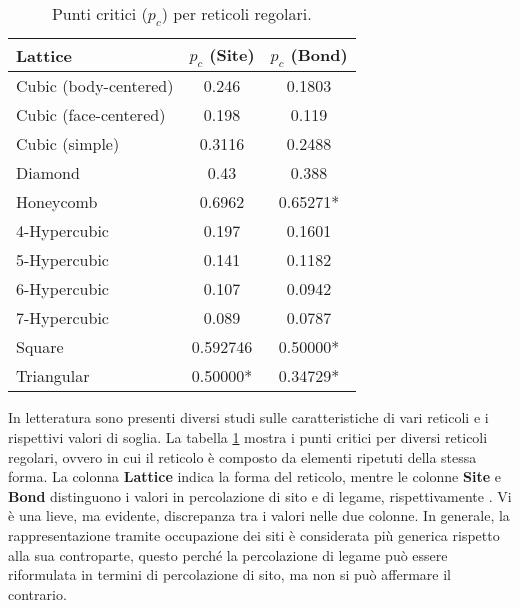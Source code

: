 \begin{table}[ht!]
    \centering
    \begin{tabular}{lcc}
    \toprule
    \textbf{Lattice} & \textbf{\(p_c\) (Site)} & \textbf{\(p_c\) (Bond)} \\
    \midrule
    Cubic (body-centered) & 0.246    & 0.1803    \\
    Cubic (face-centered) & 0.198    & 0.119     \\
    Cubic (simple)        & 0.3116   & 0.2488    \\
    Diamond               & 0.43     & 0.388     \\
    Honeycomb             & 0.6962   & 0.65271*  \\
    4-Hypercubic          & 0.197    & 0.1601    \\
    5-Hypercubic          & 0.141    & 0.1182    \\
    6-Hypercubic          & 0.107    & 0.0942    \\
    7-Hypercubic          & 0.089    & 0.0787    \\
    Square                & 0.592746 & 0.50000*  \\
    Triangular            & 0.50000* & 0.34729*  \\
    \bottomrule
    \end{tabular}
    \caption{Punti critici (\(p_c\)) per reticoli regolari.}
    \label{tab:percolation}
\end{table}

In letteratura sono presenti diversi studi sulle caratteristiche di vari 
reticoli e i rispettivi valori di soglia. La tabella \ref{tab:percolation}
mostra i punti critici per diversi reticoli regolari, ovvero in cui il reticolo è composto
da elementi ripetuti della stessa forma. La colonna \textbf{Lattice} indica la forma 
del reticolo, mentre le colonne \textbf{Site} e \textbf{Bond} distinguono i valori 
in percolazione di sito e di legame, rispettivamente \cite{stauffer-threshold}.
Vi è una lieve, ma evidente, discrepanza tra i valori nelle due colonne.
In generale, la rappresentazione tramite occupazione dei siti è considerata
più generica rispetto alla sua controparte, questo perché la percolazione di legame
può essere riformulata in termini di percolazione di sito, 
ma non si può affermare il contrario.


